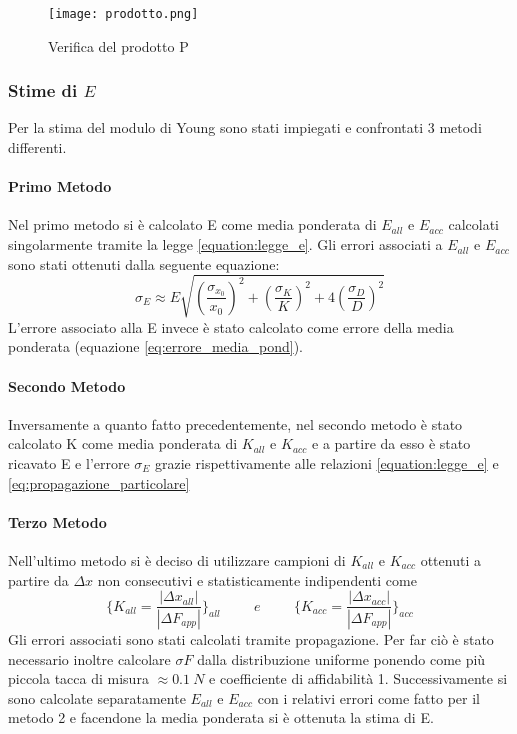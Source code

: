 \documentclass[a4paper,11pt,oneside]{article}
\begin{document}
\begin{figure}[h!]
    \centering
    
        \label{fig:a_lunghezza_cost}
        \texttt{[image: prodotto.png]}
        \caption{Verifica del prodotto P}
\end{figure}

\subsubsection*{Stime di $E$}
Per la stima del modulo di Young sono stati impiegati e confrontati 3 metodi differenti.

\paragraph{Primo Metodo} Nel primo metodo si è calcolato E come media ponderata di $E_{all}$ e $E_{acc}$ calcolati singolarmente tramite la legge \ref{equation:legge_e}. Gli errori associati a $E_{all}$ e $E_{acc}$ sono stati ottenuti dalla seguente equazione:
\begin{equation*}
    \sigma_{E} \approx E\sqrt{\left(\frac{\sigma_{x_{0}}}{x_{0}}\right)^2+\left(\frac{\sigma_{K}}{K}\right)^2+4\left(\frac{\sigma_{D}}{D}\right)^2}
    \label{eq:propagazione_particolare}
\end{equation*}
L'errore associato alla E invece è stato calcolato come errore della media ponderata (equazione \ref{eq:errore_media_pond}).

\paragraph{Secondo Metodo} Inversamente a quanto fatto precedentemente, nel secondo metodo è stato calcolato K come media ponderata di $K_{all}$ e $K_{acc}$ e a partire da esso è stato ricavato E e l'errore $\sigma_{E}$ grazie rispettivamente alle relazioni \ref{equation:legge_e} e \ref{eq:propagazione_particolare}

\paragraph{Terzo Metodo} Nell'ultimo metodo si è deciso di utilizzare campioni di $K_{all}$ e $K_{acc}$ ottenuti a partire da $\Delta x$  non consecutivi e statisticamente indipendenti come 
\begin{equation*}
    \biggl\{ K_{all} = \frac{|\Delta x_{all}|}{|\Delta F_{app}|}\biggr\}_{all}
    \hspace{1cm} e \hspace{1cm}
    \biggl\{ K_{acc} = \frac{|\Delta x_{acc}|}{|\Delta F_{app}|}\biggr\}_{acc}
\end{equation*}
Gli errori associati sono stati calcolati tramite propagazione. Per far ciò è stato necessario inoltre calcolare $\sigma F$ dalla distribuzione uniforme ponendo come più piccola tacca di misura $\approx \SI{0.1}{N}$ e coefficiente di affidabilità 1. Successivamente si sono calcolate separatamente $E_{all}$ e $E_{acc}$ con i relativi errori come fatto per il metodo 2 e facendone la media ponderata si è ottenuta la stima di E.
\end{document}
